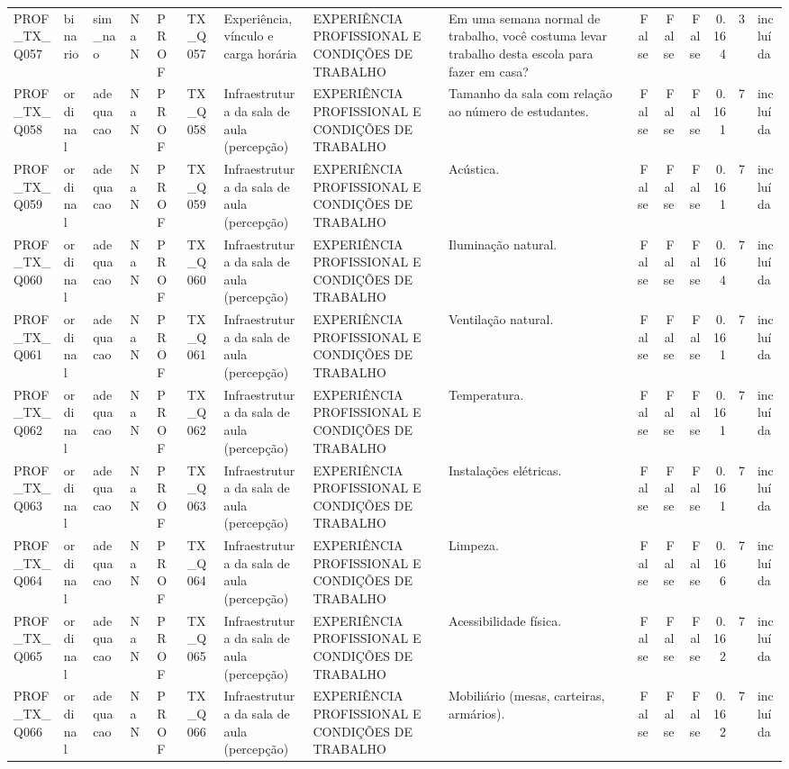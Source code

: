 \begin{tabular}{lllllllllrrrrrl}
PROF\_TX\_Q057 & binario & sim\_nao & NaN & PROF & TX\_Q057 & Experiência, vínculo e carga horária & EXPERIÊNCIA PROFISSIONAL E CONDIÇÕES DE TRABALHO & Em uma semana normal de trabalho, você costuma levar trabalho desta escola para fazer em casa? & False & False & False & 0.164 & 3 & incluída \\
PROF\_TX\_Q058 & ordinal & adequacao & NaN & PROF & TX\_Q058 & Infraestrutura da sala de aula (percepção) & EXPERIÊNCIA PROFISSIONAL E CONDIÇÕES DE TRABALHO & Tamanho da sala com relação ao número de estudantes. & False & False & False & 0.161 & 7 & incluída \\
PROF\_TX\_Q059 & ordinal & adequacao & NaN & PROF & TX\_Q059 & Infraestrutura da sala de aula (percepção) & EXPERIÊNCIA PROFISSIONAL E CONDIÇÕES DE TRABALHO & Acústica. & False & False & False & 0.161 & 7 & incluída \\
PROF\_TX\_Q060 & ordinal & adequacao & NaN & PROF & TX\_Q060 & Infraestrutura da sala de aula (percepção) & EXPERIÊNCIA PROFISSIONAL E CONDIÇÕES DE TRABALHO & Iluminação natural. & False & False & False & 0.164 & 7 & incluída \\
PROF\_TX\_Q061 & ordinal & adequacao & NaN & PROF & TX\_Q061 & Infraestrutura da sala de aula (percepção) & EXPERIÊNCIA PROFISSIONAL E CONDIÇÕES DE TRABALHO & Ventilação natural. & False & False & False & 0.161 & 7 & incluída \\
PROF\_TX\_Q062 & ordinal & adequacao & NaN & PROF & TX\_Q062 & Infraestrutura da sala de aula (percepção) & EXPERIÊNCIA PROFISSIONAL E CONDIÇÕES DE TRABALHO & Temperatura. & False & False & False & 0.161 & 7 & incluída \\
PROF\_TX\_Q063 & ordinal & adequacao & NaN & PROF & TX\_Q063 & Infraestrutura da sala de aula (percepção) & EXPERIÊNCIA PROFISSIONAL E CONDIÇÕES DE TRABALHO & Instalações elétricas. & False & False & False & 0.161 & 7 & incluída \\
PROF\_TX\_Q064 & ordinal & adequacao & NaN & PROF & TX\_Q064 & Infraestrutura da sala de aula (percepção) & EXPERIÊNCIA PROFISSIONAL E CONDIÇÕES DE TRABALHO & Limpeza. & False & False & False & 0.166 & 7 & incluída \\
PROF\_TX\_Q065 & ordinal & adequacao & NaN & PROF & TX\_Q065 & Infraestrutura da sala de aula (percepção) & EXPERIÊNCIA PROFISSIONAL E CONDIÇÕES DE TRABALHO & Acessibilidade física. & False & False & False & 0.162 & 7 & incluída \\
PROF\_TX\_Q066 & ordinal & adequacao & NaN & PROF & TX\_Q066 & Infraestrutura da sala de aula (percepção) & EXPERIÊNCIA PROFISSIONAL E CONDIÇÕES DE TRABALHO & Mobiliário (mesas, carteiras, armários). & False & False & False & 0.162 & 7 & incluída \\

\end{tabular}
